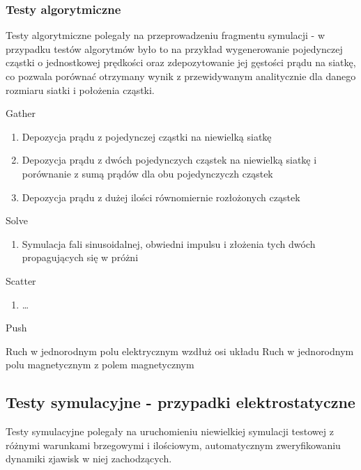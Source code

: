     \subsubsection{Testy algorytmiczne}
    Testy algorytmiczne polegały na przeprowadzeniu fragmentu symulacji - w
    przypadku testów algorytmów było to na przykład wygenerowanie pojedynczej
    cząstki o jednostkowej prędkości oraz zdepozytowanie jej gęstości prądu na
    siatkę, co pozwala porównać otrzymany wynik z przewidywanym analitycznie
    dla danego rozmiaru siatki i położenia cząstki.
    \begin{enumerate}
        \itemi Gather
            \begin{enumerate}
                \item Depozycja prądu z pojedynczej cząstki na niewielką siatkę
                \item Depozycja prądu z dwóch pojedynczych cząstek na niewielką
                    siatkę i porównanie z sumą prądów dla obu pojedynczyczh
                    cząstek
                \item Depozycja prądu z dużej ilości równomiernie rozłożonych
                    cząstek
            \end{enumerate}

        \itemi Solve
            \begin{enumerate}
                \item Symulacja fali sinusoidalnej, obwiedni impulsu i złożenia
                    tych dwóch propagujących się w próżni
            \end{enumerate}

        \itemi Scatter
            \begin{enumerate}
                \item \ldots {}
            \end{enumerate}

        \itemi Push
            \begin{enumerate}
                \itemii Ruch w jednorodnym polu elektrycznym wzdłuż osi układu
                \itemii Ruch w jednorodnym polu magnetycznym z polem
                    magnetycznym
            \end{enumerate}
    \end{enumerate}

    \subsection{Testy symulacyjne - przypadki elektrostatyczne}
    Testy symulacyjne polegały na uruchomieniu niewielkiej symulacji testowej z
    różnymi warunkami brzegowymi i ilościowym, automatycznym zweryfikowaniu
    dynamiki zjawisk w niej zachodzących.

